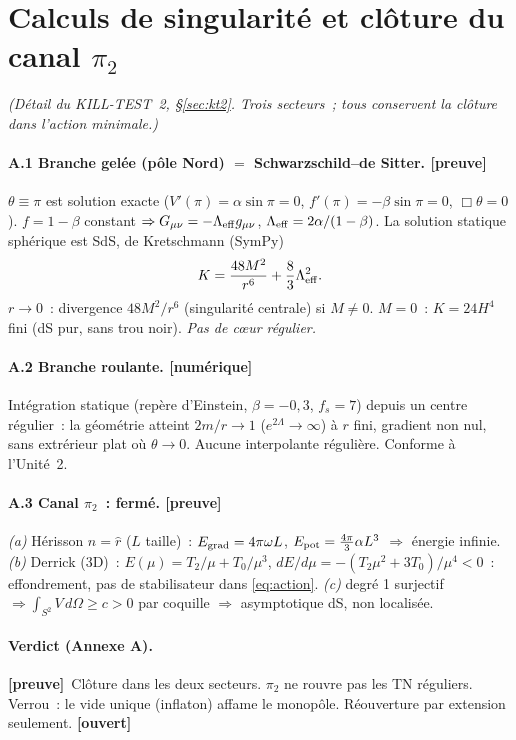 \documentclass[11pt]{article}
\newcommand{\preuve}{{\small\textbf{[preuve]}}}
\newcommand{\num}{{\small\textbf{[num\'erique]}}}
\newcommand{\ouv}{{\small\textbf{[ouvert]}}}
\theoremstyle{definition}
\begin{document}
\section{Calculs de singularit\'e et cl\^oture du canal $\pi_2$}\label{ann:A}
\emph{(D\'etail du KILL-TEST~2, \S\ref{sec:kt2}. Trois secteurs~; tous conservent la cl\^oture dans
l'action minimale.)}

\paragraph{A.1 Branche gel\'ee (p\^ole Nord) $=$ Schwarzschild--de Sitter. \preuve}
$\theta\equiv\pi$ est solution exacte ($V'(\pi)=\alpha\sin\pi=0$, $f'(\pi)=-\beta\sin\pi=0$,
$\Box\theta=0$). $f=1-\beta$ constant $\Rightarrow G_{\mu\nu}=-\Lambda_{\rm eff}g_{\mu\nu}$,
$\Lambda_{\rm eff}=2\alpha/(1-\beta)$. La solution statique sph\'erique est SdS, de Kretschmann (SymPy)
\[ K=\frac{48M^2}{r^6}+\frac{8}{3}\Lambda_{\rm eff}^2. \]
$r\to0$~: divergence $48M^2/r^6$ (singularit\'e centrale) si $M\ne0$. $M=0$~: $K=24H^4$ fini (dS pur,
sans trou noir). \emph{Pas de c\oe ur r\'egulier.}

\paragraph{A.2 Branche roulante. \num}
Int\'egration statique (rep\`ere d'Einstein, $\beta=-0{,}3$, $f_s=7$) depuis un centre r\'egulier~: la
g\'eom\'etrie atteint $2m/r\to1$ ($e^{2\Lambda}\to\infty$) \`a $r$ fini, gradient non nul, sans extr\'erieur
plat o\`u $\theta\to0$. Aucune interpolante r\'eguli\`ere. Conforme \`a l'Unit\'e~2.

\paragraph{A.3 Canal $\pi_2$~: ferm\'e. \preuve}
\emph{(a)} H\'erisson $n=\hat r$ ($L$ taille)~: $E_{\rm grad}=4\pi\omega L$, $E_{\rm pot}=\tfrac{4\pi}{3}\alpha L^3$
$\Rightarrow$ \'energie infinie. \emph{(b)} Derrick (3D)~: $E(\mu)=T_2/\mu+T_0/\mu^3$,
$dE/d\mu=-(T_2\mu^2+3T_0)/\mu^4<0$~: effondrement, pas de stabilisateur dans \eqref{eq:action}.
\emph{(c)} degr\'e 1 surjectif $\Rightarrow\int_{S^2}V\,d\Omega\ge c>0$ par coquille $\Rightarrow$
asymptotique dS, non localis\'ee.

\paragraph{Verdict (Annexe A).} \preuve\ Cl\^oture dans les deux secteurs. $\pi_2$ ne rouvre pas les TN
r\'eguliers. Verrou~: le vide unique (inflaton) affame le monop\^ole. R\'eouverture par extension
seulement. \ouv
\end{document}
